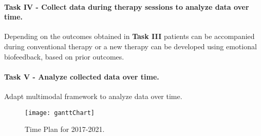 \begin{comment}
\paragraph{Task IV - Analyze influence of emotional biofeedback in stutter therapy over time.} Existing therapy exercises will be combined with emotional biofeedback. Given the insights from \textbf{Task IIb}, the modalities which gather most information will be used to collect data during several therapy sessions. As the collected data will represent the progress over time, a mathematical framework will be developed to represent the evolution over time. This representation can be used to develop a measurement of the benefit the therapy provides.
\end{comment}

\paragraph{Task IV - Collect data during therapy sessions to analyze data over time.} Depending on the outcomes obtained in \textbf{Task III} patients can be accompanied during conventional therapy or a new therapy can be developed using emotional biofeedback, based on prior outcomes.

\paragraph{Task V - Analyze collected data over time.} Adapt multimodal framework to analyze data over time.


\begin{figure}
    \centering
    \texttt{[image: ganttChart]}
    \caption{Time Plan for 2017-2021.}
    \label{fig:timePlan}
\end{figure}






